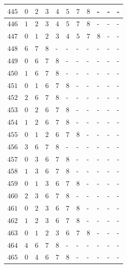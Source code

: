 \begin{appendices}
\begin{table}[H]
\begin{tabular} {|l|l|l|l|l|l|l|l|l|l|l|}
  		$ 445 $ & $ 0 $ &$ 2 $ &$ 3 $ &$ 4 $ &$ 5 $ &$ 7 $ &$ 8 $ & - &  - &  -   \\ \hline
  		$ 446 $ & $ 1 $ &$ 2 $ &$ 3 $ &$ 4 $ &$ 5 $ &$ 7 $ &$ 8 $ & - &  - &  -   \\ \hline
  		$ 447 $ & $ 0 $ &$ 1 $ &$ 2 $ &$ 3 $ &$ 4 $ &$ 5 $ &$ 7 $ &$ 8 $ & - &  -   \\ \hline
  		$ 448 $ & $ 6 $ &$ 7 $ &$ 8 $ & - &  - &  - &  - &  - &  - &  -   \\ \hline
  		$ 449 $ & $ 0 $ &$ 6 $ &$ 7 $ &$ 8 $ & - &  - &  - &  - &  - &  -   \\ \hline
  		$ 450 $ & $ 1 $ &$ 6 $ &$ 7 $ &$ 8 $ & - &  - &  - &  - &  - &  -   \\ \hline
  		$ 451 $ & $ 0 $ &$ 1 $ &$ 6 $ &$ 7 $ &$ 8 $ & - &  - &  - &  - &  -   \\ \hline
  		$ 452 $ & $ 2 $ &$ 6 $ &$ 7 $ &$ 8 $ & - &  - &  - &  - &  - &  -   \\ \hline
  		$ 453 $ & $ 0 $ &$ 2 $ &$ 6 $ &$ 7 $ &$ 8 $ & - &  - &  - &  - &  -   \\ \hline
  		$ 454 $ & $ 1 $ &$ 2 $ &$ 6 $ &$ 7 $ &$ 8 $ & - &  - &  - &  - &  -   \\ \hline
  		$ 455 $ & $ 0 $ &$ 1 $ &$ 2 $ &$ 6 $ &$ 7 $ &$ 8 $ & - &  - &  - &  -   \\ \hline
  		$ 456 $ & $ 3 $ &$ 6 $ &$ 7 $ &$ 8 $ & - &  - &  - &  - &  - &  -   \\ \hline
  		$ 457 $ & $ 0 $ &$ 3 $ &$ 6 $ &$ 7 $ &$ 8 $ & - &  - &  - &  - &  -   \\ \hline
  		$ 458 $ & $ 1 $ &$ 3 $ &$ 6 $ &$ 7 $ &$ 8 $ & - &  - &  - &  - &  -   \\ \hline
  		$ 459 $ & $ 0 $ &$ 1 $ &$ 3 $ &$ 6 $ &$ 7 $ &$ 8 $ & - &  - &  - &  -   \\ \hline
  		$ 460 $ & $ 2 $ &$ 3 $ &$ 6 $ &$ 7 $ &$ 8 $ & - &  - &  - &  - &  -   \\ \hline
  		$ 461 $ & $ 0 $ &$ 2 $ &$ 3 $ &$ 6 $ &$ 7 $ &$ 8 $ & - &  - &  - &  -   \\ \hline
  		$ 462 $ & $ 1 $ &$ 2 $ &$ 3 $ &$ 6 $ &$ 7 $ &$ 8 $ & - &  - &  - &  -   \\ \hline
  		$ 463 $ & $ 0 $ &$ 1 $ &$ 2 $ &$ 3 $ &$ 6 $ &$ 7 $ &$ 8 $ & - &  - &  -   \\ \hline
  		$ 464 $ & $ 4 $ &$ 6 $ &$ 7 $ &$ 8 $ & - &  - &  - &  - &  - &  -   \\ \hline
  		$ 465 $ & $ 0 $ &$ 4 $ &$ 6 $ &$ 7 $ &$ 8 $ & - &  - &  - &  - &  -   \\ \hline

\end{tabular}
\end{table}
\end{appendices}
